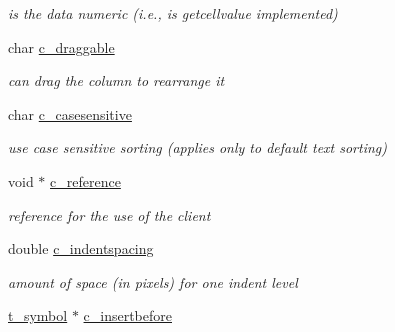 \begin{DoxyCompactItemize}
\begin{DoxyCompactList}\small\item\em is the data numeric (i.e., is getcellvalue implemented) \item\end{DoxyCompactList}\item 
\hypertarget{structt__jcolumn_ac2e56f5472e731754786bcddd72639a3}{
char \hyperlink{structt__jcolumn_ac2e56f5472e731754786bcddd72639a3}{c\_\-draggable}}
\label{structt__jcolumn_ac2e56f5472e731754786bcddd72639a3}

\begin{DoxyCompactList}\small\item\em can drag the column to rearrange it \item\end{DoxyCompactList}\item 
\hypertarget{structt__jcolumn_a92a7e7a4102035eab5b328800e02d503}{
char \hyperlink{structt__jcolumn_a92a7e7a4102035eab5b328800e02d503}{c\_\-casesensitive}}
\label{structt__jcolumn_a92a7e7a4102035eab5b328800e02d503}

\begin{DoxyCompactList}\small\item\em use case sensitive sorting (applies only to default text sorting) \item\end{DoxyCompactList}\item 
\hypertarget{structt__jcolumn_a08c73ac397a3df1d284643a55fd25803}{
void $\ast$ \hyperlink{structt__jcolumn_a08c73ac397a3df1d284643a55fd25803}{c\_\-reference}}
\label{structt__jcolumn_a08c73ac397a3df1d284643a55fd25803}

\begin{DoxyCompactList}\small\item\em reference for the use of the client \item\end{DoxyCompactList}\item 
\hypertarget{structt__jcolumn_af3acd396c2cac1a9cf647fc8847c2977}{
double \hyperlink{structt__jcolumn_af3acd396c2cac1a9cf647fc8847c2977}{c\_\-indentspacing}}
\label{structt__jcolumn_af3acd396c2cac1a9cf647fc8847c2977}

\begin{DoxyCompactList}\small\item\em amount of space (in pixels) for one indent level \item\end{DoxyCompactList}\item 
\hypertarget{structt__jcolumn_a898eec6744e8853ea060a16b943abca6}{
\hyperlink{structt__symbol}{t\_\-symbol} $\ast$ \hyperlink{structt__jcolumn_a898eec6744e8853ea060a16b943abca6}{c\_\-insertbefore}}
\label{structt__jcolumn_a898eec6744e8853ea060a16b943abca6}


\end{DoxyCompactItemize}
